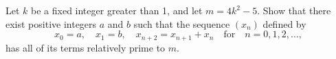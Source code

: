 Let $k$ be a fixed integer greater than 1, and let ${m=4k^2-5}$. Show that there exist positive integers $a$ and $b$ such that the sequence $(x_n)$ defined by \[x_0=a,\quad x_1=b,\quad x_{n+2}=x_{n+1}+x_n\quad\text{for}\quad n=0,1,2,\dots,\] has all of its terms relatively prime to $m$.

